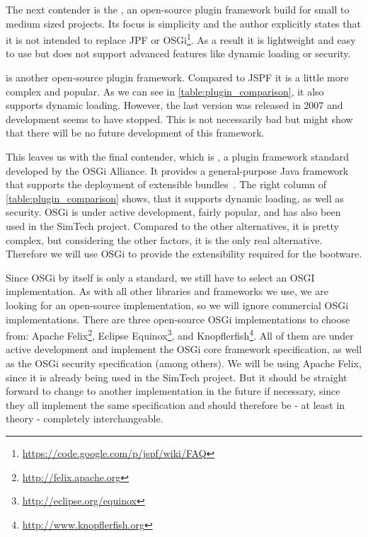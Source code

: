 The next contender is the , an open-source plugin framework build for small to medium sized projects.
Its focus is simplicity and the author explicitly states that it is not intended to replace JPF or OSGi\footnote{\url{https://code.google.com/p/jspf/wiki/FAQ}}.
As a result it is lightweight and easy to use but does not support advanced features like dynamic loading or security.

 is another open-source plugin framework.
Compared to JSPF it is a little more complex and popular.
As we can see in \autoref{table:plugin_comparison}, it also supports dynamic loading.
However, the last version was released in 2007 and development seems to have stopped.
This is not necessarily bad but might show that there will be no future development of this framework.

This leaves us with the final contender, which is , a plugin framework standard developed by the OSGi Alliance.
It provides a general-purpose Java framework that supports the deployment of extensible bundles~\autocite{osgi:spec}.
The right column of \autoref{table:plugin_comparison} shows, that it supports dynamic loading, as well as security.
OSGi is under active development, fairly popular, and has also been used in the SimTech project.
Compared to the other alternatives, it is pretty complex, but considering the other factors, it is the only real alternative.
Therefore we will use OSGi to provide the extensibility required for the bootware.

Since OSGi by itself is only a standard, we still have to select an OSGI implementation.
As with all other libraries and frameworks we use, we are looking for an open-source implementation, so we will ignore commercial OSGi implementations.
There are three open-source OSGi implementations to choose from: Apache Felix\footnote{\url{http://felix.apache.org}}, Eclipse Equinox\footnote{\url{http://eclipse.org/equinox}}, and Knopflerfish\footnote{\url{http://www.knopflerfish.org}}.
All of them are under active development and implement the OSGi core framework specification, as well as the OSGi security specification (among others).
We will be using Apache Felix, since it is already being used in the SimTech project.
But it should be straight forward to change to another implementation in the future if necessary, since they all implement the same specification and should therefore be - at least in theory - completely interchangeable.
